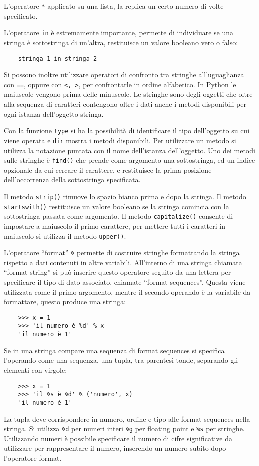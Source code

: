 \documentclass{article}
\numberwithin{equation}{subsection}
\begin{document}
L'operatore \verb|*| applicato su una lista, la replica un certo numero di volte specificato. 

L'operatore \verb|in| è estremamente importante, permette di individuare se una stringa è sottostringa di un'altra, restituisce un valore booleano vero o falso:
\begin{verbatim}
    stringa_1 in stringa_2
\end{verbatim}

Si possono inoltre utilizzare operatori di confronto tra stringhe all'uguaglianza con \verb|==|, oppure con \verb|<, >|, per confrontarle in ordine alfabetico. 
In Python le maiuscole vengono prima delle minuscole. 
Le stringhe sono degli oggetti che oltre alla sequenza di caratteri contengono oltre i dati anche i metodi disponibili per ogni istanza dell'oggetto stringa. 

Con la funzione \verb|type| si ha la possibilità di identificare il tipo dell'oggetto su cui viene operata e \verb|dir| mostra i metodi disponibili. 
Per utilizzare un metodo si utilizza la notazione puntata con il nome dell'istanza dell'oggetto. 
Uno dei metodi sulle stringhe è \verb|find()| che prende come argomento una sottostringa, ed un indice opzionale da cui cercare il carattere, e restituisce la prima 
posizione dell'occorrenza della sottostringa specificata. 

Il metodo \verb|strip()| rimuove lo spazio bianco prima e dopo la stringa. Il metodo \verb|startswith()| restituisce un valore booleano se la stringa comincia 
con la sottostringa passata come argomento. Il metodo \verb|capitalize()| consente di impostare a maiuscolo il primo carattere, per mettere tutti i caratteri in 
maiuscolo si utilizza il metodo \verb|upper()|. 

L'operatore ``format'' \verb|%| permette di costruire stringhe formattando la stringa rispetto a dati contenuti in altre variabili. All'interno di una stringa 
chiamata ``format string'' si può inserire questo operatore seguito da una lettera per specificare il tipo di dato associato, chiamate ``format sequences''. Questa 
viene utilizzata come il primo argomento, mentre il secondo operando è la variabile da formattare, questo produce una stringa:
\begin{verbatim}
    >>> x = 1
    >>> 'il numero è %d' % x
    'il numero è 1' 
\end{verbatim}

Se in una stringa compare una sequenza di format sequences si specifica l'operando come una sequenza, una tupla, tra parentesi tonde, separando gli elementi con virgole:
\begin{verbatim}
    >>> x = 1
    >>> 'il %s è %d' % ('numero', x)
    'il numero è 1' 
\end{verbatim}
La tupla deve corrispondere in numero, ordine e tipo alle format sequences nella stringa. 
Si utilizza \verb|%d| per numeri interi \verb|%g| per floating point e \verb|%s| per stringhe. Utilizzando numeri è possibile specificare il numero di cifre significative da utilizzare per 
rappresentare il numero, inserendo un numero subito dopo l'operatore format. 
\end{document}
